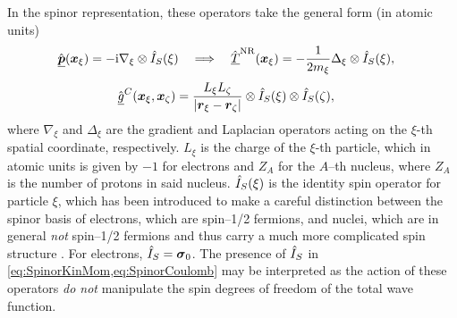 In the spinor representation, these operators take the general form (in atomic units)
\begin{align}
  \label{eq:SpinorKinMom}
  &\hat{\underline{\boldsymbol{p}}}(\boldsymbol{x}_\xi) = -\mathrm i \nabla_\xi \otimes \hat{I}_S(\xi) \quad \Longrightarrow \quad 
  \hat{\underline{T}}^{\mathrm{NR}}(\boldsymbol{x}_\xi) = - \frac{1}{2m_\xi} \Delta_\xi \otimes \hat{I}_S(\xi),
\end{align}
\begin{align}
  \label{eq:SpinorCoulomb}
  &\hat{\underline{g}}^C(\boldsymbol{x}_\xi,\boldsymbol{x}_\zeta) = 
    \frac{L_\xi L_\zeta}{\vert \boldsymbol{r}_\xi - \boldsymbol{r}_\zeta \vert} \otimes \hat{I}_S(\xi) \otimes \hat{I}_S(\zeta),
\end{align}
where $\nabla_\xi$ and $\Delta_\xi$ are the gradient and Laplacian operators acting on the $\xi$-th spatial coordinate,
respectively. $L_\xi$ is the charge of the $\xi$-th particle, which in atomic units is given by $-1$ for electrons and 
$Z_A$ for the $A$--th nucleus, where $Z_A$ is the number of protons in said nucleus. 
$\hat{I}_S(\xi)$  is the identity spin operator for particle $\xi$, which has been introduced to make a
careful distinction between the spinor basis of electrons, which are spin--1/2 fermions, and nuclei, which are in general
\emph{not} spin--1/2 fermions and thus carry a much more complicated spin structure . For electrons, $\hat{I}_S=\boldsymbol{\sigma}_{0}$.
The presence of $\hat{I}_S$ in \cref{eq:SpinorKinMom,eq:SpinorCoulomb} may be interpreted as the action of these operators 
\emph{do not} manipulate the spin degrees of freedom of the total wave function.

